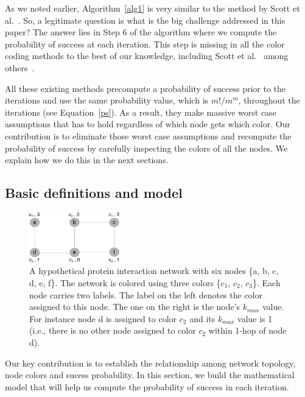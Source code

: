 \documentclass{ws-procs11x85}
\begin{document}
As we noted earlier, Algorithm~\ref{alg1} is very similar to the
method by Scott et al.~\cite{scott}. So, a legitimate question is what
is the big challenge addressed in this paper? The answer lies in Step
6 of the algorithm where we compute the probability of success at each
iteration. This step is missing in all the color coding methods to the
best of our knowledge, including Scott et al.~\cite{scott} among
others~\cite{alon, shlomi, dost, gulsoy}. 

 All these existing
methods precompute a probability of success prior to the iterations
and use the same probability value, which is $m!/m^m$, throughout the
iterations (see Equation~\ref{ps}). As a result, they make massive
worst case assumptions that has to hold regardless of which node gets
which color. Our contribution is to eliminate those worst case
assumptions and recompute the probability of success by carefully
inspecting the colors of all the nodes. We explain how we do this in
the next sections.



\subsection{Basic definitions and model}


\begin{figure}
  \centering
  \includegraphics[width=0.35\textwidth]{figures/colors}
  \caption{ A hypothetical protein interaction network with six nodes
    \{a, b, c, d, e, f\}. The network is colored using three colors
    \{$c_1$, $c_2$, $c_3$\}. Each node carries two labels.  The label
    on the left denotes the color assigned to this node.  The one on
    the right is the node's $k_{max}$ value. For instance node d is
    assigned to color $c_2$ and its $k_{max}$ value is 1 (i.e., there
    is no other node assigned to color $c_2$ within 1-hop of node d). }
  \label{fig:colors}
\end{figure}


Our key contribution is to establish the relationship among network
topology, node colors and sucess probability.    In this
section, we build the mathematical model that will help us compute the
probability of success in each iteration.
\end{document}

